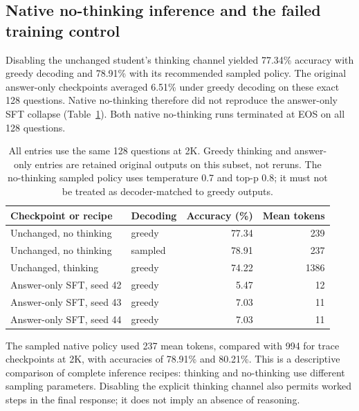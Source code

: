 \subsection{Native no-thinking inference and the failed training control}
Disabling the unchanged student's thinking channel yielded 77.34\% accuracy with greedy decoding and 78.91\% with its recommended sampled policy. The original answer-only checkpoints averaged 6.51\% under greedy decoding on these exact 128 questions. Native no-thinking therefore did not reproduce the answer-only SFT collapse (Table~\ref{tab:nothinking}). Both native no-thinking runs terminated at EOS on all 128 questions.
\par\begin{table}[ht]\centering\small\begin{tabular}{llrr}\toprule
Checkpoint or recipe & Decoding & Accuracy (\%) & Mean tokens \\
\midrule
Unchanged, no thinking & greedy & 77.34 & 239 \\
Unchanged, no thinking & sampled & 78.91 & 237 \\
Unchanged, thinking & greedy & 74.22 & 1386 \\
Answer-only SFT, seed 42 & greedy & 5.47 & 12 \\
Answer-only SFT, seed 43 & greedy & 7.03 & 11 \\
Answer-only SFT, seed 44 & greedy & 7.03 & 11 \\
\bottomrule\end{tabular}\caption{All entries use the same 128 questions at 2K. Greedy thinking and answer-only entries are retained original outputs on this subset, not reruns. The no-thinking sampled policy uses temperature 0.7 and top-p 0.8; it must not be treated as decoder-matched to greedy outputs.}\label{tab:nothinking}\end{table}\par
The sampled native policy used 237 mean tokens, compared with 994 for trace checkpoints at 2K, with accuracies of 78.91\% and 80.21\%. This is a descriptive comparison of complete inference recipes: thinking and no-thinking use different sampling parameters. Disabling the explicit thinking channel also permits worked steps in the final response; it does not imply an absence of reasoning.
